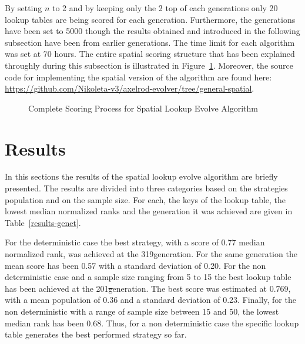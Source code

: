 By setting \(n\) to 2 and by keeping only the 2 top of each generations only
20 lookup tables are being scored for each generation. Furthermore, the generations
have been set to 5000 though the results obtained and introduced in the following
subsection have been from earlier generations. The time limit for each algorithm
was set at 70 hours. The entire spatial scoring structure that
has been explained throughly during this subsection is illustrated in Figure~\ref{fig:spatial-evolve}.
Moreover, the source code for implementing the spatial version of the algorithm
are found here: \url{https://github.com/Nikoleta-v3/axelrod-evolver/tree/general-spatial}.

\begin{figure}[H]
		
		\caption{Complete Scoring Process for Spatial Lookup Evolve Algorithm}
  \label{fig:spatial-evolve}
\end{figure}

\section{Results}
In this sections the results of the spatial lookup evolve algorithm are briefly
presented. The results are divided into three categories based on the strategies
population and on the sample size. For each, the keys of the lookup table,
the lowest median normalized ranks and the generation it was achieved are given
in Table~\ref{results-genet}.

For the deterministic case the best strategy, with a score of 0.77 median normalized
rank, was achieved at the 319\nth generation. For the same generation the mean score
has been 0.57 with a standard deviation of 0.20. For the non deterministic case
and a sample size ranging from 5 to 15 the best lookup table has been achieved at
the 201\st generation. The best score was estimated at 0.769, with a mean population
of 0.36 and a standard deviation of 0.23. Finally, for the non deterministic with
a range of sample size between 15 and 50, the lowest median rank has been 0.68.
Thus, for a non deterministic case the specific lookup table generates
the best performed strategy so far.


